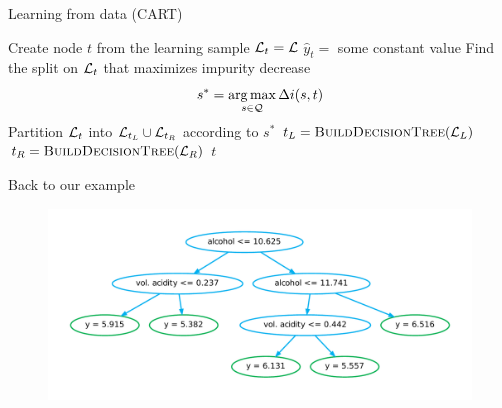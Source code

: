 \documentclass{beamer}
\DeclareMathOperator*{\argmax}{arg\,max}
\begin{document}
\begin{frame}[fragile]{Learning from data {\scriptsize (CART)}}

\begin{algorithmic}
    \State Create node $t$ from the learning sample ${\cal L}_t = {\cal L}$
        \State $\widehat{y}_{t} =$ some constant value
    \Else
        \State Find the split on ${\cal L}_t$ that maximizes impurity decrease $$s^* = \argmax_{s \in {\cal Q}} \Delta i(s, t)$$
        \State Partition ${\cal L}_t$ into ${\cal L}_{t_L} \cup {\cal L}_{t_R}$ according to $s^*$
        \State $t_L = \Call{BuildDecisionTree}{{\cal L}_{L}}$
        \State $t_R = \Call{BuildDecisionTree}{{\cal L}_{R}}$
    \EndIf
    \State \Return $t$
\EndFunction
\end{algorithmic}

\end{frame}

\begin{frame}{Back to our example}
\begin{figure}
\includegraphics[scale=0.4]{./figures/tree-wine.pdf}
\end{figure}
\end{frame}

\end{document}
